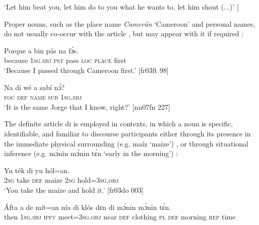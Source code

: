 \glt ‘Let him beat you, let him do to you what he wants to, let him shout (...)’ [\textstylePichiglossZchn{bo03cb 135]}
\z

Proper nouns, such as the place name \textit{Camerún} ‘Cameroon’ and personal names, do not usually co-occur with the article , but may appear with it if required : 


\ea%
    \label{ex:key:167}
    \gll Porque  a    bin  pás  na      fɔ́s.\\
because  \textsc{1sg.sbj}  \textsc{pst}  pass  \textsc{loc}  \textsc{place}    first\\

\glt ‘Because I passed through Cameroon first.’ [fr03ft 98]
\z


\ea%
    \label{ex:key:168}
    \gll Na  di        wé    a    sabí    nɔ́?\\
\textsc{foc}\textstylePichiexamplenumberZchnZchn{} \textsc{def}  \textsc{name}\textstylePichiexamplenumberZchnZchn{} \textsc{sub}    \textsc{1sg.sbj}   \\

\glt ‘It is the same Jorge that I know, right?’ [nn07fn 227]
\z

The definite article di is employed in contexts, in which a noun is specific, identifiable, and familiar to discourse participants either through its presence in the immediate physical surrounding (e.g. maíz ‘maize’) , or through situational inference (e.g. mɔ́nin mɔ́nin tɛ́n ‘early in the morning’) :


\ea%
    \label{ex:key:169}
    \gll Yu  ték    di    yu  hól=an.\\
\textsc{2sg}  take    \textsc{def}  maize  \textsc{2sg}  hold=\textsc{3sg.obj}\\

\glt ‘You take the maize and hold it.’ [fr03do 003]
\z


\ea%
    \label{ex:key:170}
    \gll \'{A}fta    a    de  mít=an    nía    di  klós    dɛn di  mɔ́nin  mɔ́nin  tɛ́n.\\
then  \textsc{1sg.sbj}  \textsc{ipfv}  meet=\textsc{3sg.obj}  near    \textsc{def}  clothing  \textsc{pl} 
 \textsc{def}  morning  \textsc{rep}    time\\

